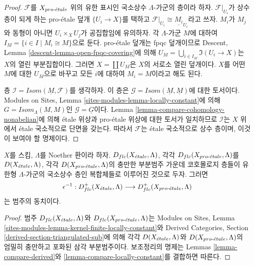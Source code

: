 \begin{proof}
$\mathcal{F}$를 $X_{pro\text{-}\acute{e}tale}$ 위의 유한 표시인 국소상수
$\Lambda$-가군의 층이라 하자. $\mathcal{F}|_{U_i}$가 상수 층이 되게
하는 pro-\'etale 덮개 $\{U_i \to X\}$를 택하고
$\mathcal{F}|_{U_i} \cong \underline{M_i}_{U_i}$라고 쓰자.
$M_i$가 $M_j$와 동형이 아니면 $U_i \times_X U_j$가 공집합임에
유의하자. 각 $\Lambda$-가군 $M$에 대하여
$I_M = \{i \in I \mid M_i \cong M\}$으로 둔다. pro-\'etale 덮개는
fpqc 덮개이므로 Descent, Lemma
\ref{descent-lemma-open-fpqc-covering}에 의해
$U_M = \bigcup_{i \in I_M} \Im(U_i \to X)$는 $X$의 열린 부분집합이다.
그러면 $X = \coprod U_M$은 $X$의 서로소 열린 덮개이다.
$X$를 어떤 $M$에 대한 $U_M$으로 바꾸고 모든 $i$에 대하여
$M_i = M$이라고 해도 된다.

\medskip\noindent
층 $\mathcal{I} = \mathit{Isom}(\underline{M}, \mathcal{F})$를 생각하자.
이 층은 $\mathcal{G} = \mathit{Isom}(\underline{M}, \underline{M})$에
대한 토서이다. Modules on Sites, Lemma
\ref{sites-modules-lemma-locally-constant}에 의해
$G = \mathit{Isom}_\Lambda(M, M)$인 $\mathcal{G} = \underline{G}$이다.
Lemma \ref{lemma-compare-cohomology-nonabelian}에 의해 \'etale 위상과
pro-\'etale 위상에 대한 토서가 일치하므로 $\mathcal{I}$는 $X$ 위에서
\'etale 국소적으로 단면을 갖는다. 따라서 $\mathcal{F}$는 \'etale
국소적으로 상수 층이며, 이것이 보여야 할 명제이다.
\end{proof}

\begin{lemma}
\label{lemma-compare-locally-constant-derived}
$X$를 스킴, $\Lambda$를 Noether 환이라 하자.
$D_{flc}(X_{\acute{e}tale}, \Lambda)$, 각각 $D_{flc}(X_{pro\text{-}\acute{e}tale}, \Lambda)$를
$D(X_{\acute{e}tale}, \Lambda)$, 각각 $D(X_{pro\text{-}\acute{e}tale}, \Lambda)$의 충만한
부분범주 가운데 코호몰로지 층들이 유한형 $\Lambda$-가군의 국소상수
층인 복합체들로 이루어진 것으로 두자. 그러면
$$
\epsilon^{-1} :
D_{flc}^+(X_{\acute{e}tale}, \Lambda)
\longrightarrow
D_{flc}^+(X_{pro\text{-}\acute{e}tale}, \Lambda)
$$
는 범주의 동치이다.
\end{lemma}

\begin{proof}
범주 $D_{flc}(X_{\acute{e}tale}, \Lambda)$와
$D_{flc}(X_{pro\text{-}\acute{e}tale}, \Lambda)$는 Modules on Sites, Lemma
\ref{sites-modules-lemma-kernel-finite-locally-constant}와 Derived
Categories, Section \ref{derived-section-triangulated-sub}에 의해 각각
$D(X_{\acute{e}tale}, \Lambda)$와 $D(X_{pro\text{-}\acute{e}tale}, \Lambda)$의 엄밀히 충만하고
포화된 삼각 부분범주이다. 보조정리의 명제는 Lemmas
\ref{lemma-compare-derived}와 \ref{lemma-compare-locally-constant}를
결합하면 따른다.
\end{proof}

